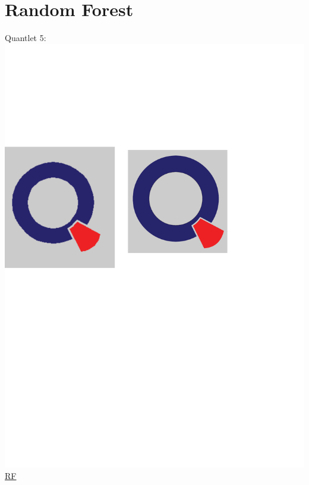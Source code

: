 \documentclass[12pt, a4paper, bibliography=totoc, english]{scrartcl}
\begin{document}
\section{Random Forest}
Quantlet 5:\includegraphics[scale=0.08]{qletlogo}
\textcolor{blue}{\href{https://github.com/JingyiLiu3136/MLFBM/tree/master/RF}{RF}}\\
\end{document}
